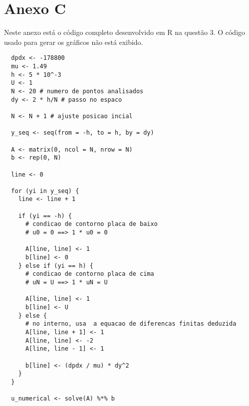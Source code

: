 \section*{Anexo C}

Neste anexo está o código completo desenvolvido em R na questão 3. O código usado para gerar os gráficos não está exibido.

\begin{lstlisting}
  dpdx <- -178800
  mu <- 1.49
  h <- 5 * 10^-3
  U <- 1
  N <- 20 # numero de pontos analisados 
  dy <- 2 * h/N # passo no espaco

  N <- N + 1 # ajuste posicao incial

  y_seq <- seq(from = -h, to = h, by = dy)

  A <- matrix(0, ncol = N, nrow = N)
  b <- rep(0, N)
  
  line <- 0
  
  for (yi in y_seq) {
    line <- line + 1
    
    if (yi == -h) {
      # condicao de contorno placa de baixo
      # u0 = 0 ==> 1 * u0 = 0
      
      A[line, line] <- 1
      b[line] <- 0
    } else if (yi == h) {
      # condicao de contorno placa de cima
      # uN = U ==> 1 * uN = U
      
      A[line, line] <- 1
      b[line] <- U
    } else {
      # no interno, usa  a equacao de diferencas finitas deduzida
      A[line, line + 1] <- 1
      A[line, line] <- -2
      A[line, line - 1] <- 1
      
      b[line] <- (dpdx / mu) * dy^2
    }
  }
  
  u_numerical <- solve(A) %*% b
\end{lstlisting}